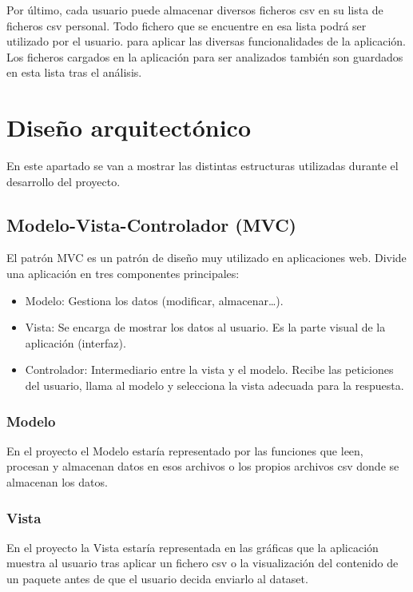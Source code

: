 Por último, cada usuario puede almacenar diversos ficheros csv en su lista de ficheros csv personal. Todo fichero que se encuentre en esa lista podrá ser utilizado por el usuario. para aplicar las diversas funcionalidades de la aplicación. Los ficheros cargados en la aplicación para ser analizados también son guardados en esta lista tras el análisis. 

\section{Diseño arquitectónico}
En este apartado se van a mostrar las distintas estructuras utilizadas durante el desarrollo del proyecto.

\subsection{Modelo-Vista-Controlador (MVC)}

El patrón MVC es un patrón de diseño muy utilizado en aplicaciones web. Divide una aplicación en tres componentes principales:

\begin{itemize}
    \item Modelo: Gestiona los datos (modificar, almacenar\ldots).
    \item Vista: Se encarga de mostrar los datos al usuario. Es la parte visual de la aplicación (interfaz).
    \item Controlador: Intermediario entre la vista y el modelo. Recibe las peticiones del usuario, llama al modelo y selecciona la vista adecuada para la respuesta.
\end{itemize}

\subsubsection{Modelo}
En el proyecto el Modelo estaría representado por las funciones que leen, procesan y almacenan datos en esos archivos o los propios archivos csv donde se almacenan los datos.

\subsubsection{Vista}
En el proyecto la Vista estaría representada en las gráficas que la aplicación muestra al usuario tras aplicar un fichero csv o la visualización del contenido de un paquete antes de que el usuario decida enviarlo al dataset.

